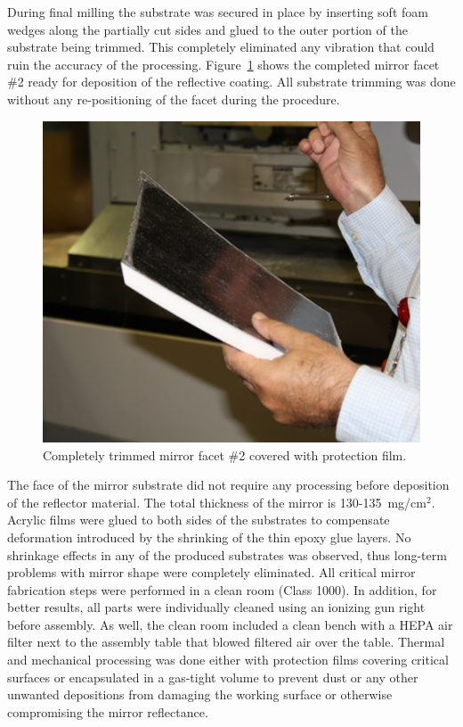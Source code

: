During final milling the substrate was secured in place by inserting soft foam wedges along the partially cut sides
and glued to the outer portion of the substrate being trimmed. This completely eliminated any vibration that could
ruin the accuracy of the processing. Figure~\ref{fig:Trimmed} shows the completed mirror facet \#2 ready for
deposition of the reflective coating. All substrate trimming was done without any re-positioning of the facet during
the procedure. 

\begin{figure}[ht]
    \centering
    \includegraphics[width=1.0\linewidth]{images/Trimmed}
    \caption{Completely trimmed mirror facet \#2 covered with protection film. }
    \label{fig:Trimmed}
\end{figure}

The face of the mirror substrate did not require any processing before deposition of the reflector material. The
total thickness of the mirror is 130-135~mg/cm$^2$. Acrylic films were glued to both sides of the substrates to
compensate deformation introduced by the shrinking of the thin epoxy glue layers. No shrinkage effects in any of
the produced substrates was observed, thus long-term problems with mirror shape were completely eliminated.
All critical mirror fabrication steps were performed in a clean room (Class 1000). In addition, for better results,
all parts were individually cleaned using an ionizing gun right before assembly. As well, the clean room included a
clean bench with a HEPA air filter next to the assembly table that blowed filtered air over the table. Thermal and
mechanical processing was done either with protection films covering critical surfaces or encapsulated in a gas-tight
volume to prevent dust or any other unwanted depositions from damaging the working surface or otherwise
compromising the mirror reflectance.

